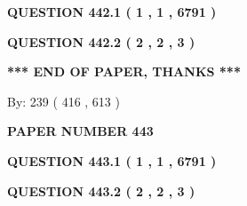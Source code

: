 \documentclass[12pt]{article}
\begin{document}
   
   
   
 \vspace{0.2in}
 
 
 
 
   
   
  
\vspace{0.2in}
  
{\textbf{\Large{QUESTION
442.1 
 ( 1 , 1 , 6791 )
}}}
  
  
  
\vspace{0.2in}
  
{\textbf{\Large{QUESTION
442.2 
 ( 2 , 2 , 3 )
}}}
  
  
   
   
 \vspace{0.2in}
 
   
   
   
   
\vspace{1.0in} 
{\textbf{\large{ *** END OF PAPER, THANKS *** }}} 
   
   
\hspace{1.0in} By: 
 239 ( 416 ,  613 )
   
   
   
   
\newpage 
\setcounter{page}{ 
   443001 } 
   
   
   
   
 {\textbf{ \Large{ PAPER NUMBER  443  }}}
   
   
\vspace{0.2in}
   
   
   
   
   
   
 \vspace{0.2in}
 
 
 
 
   
   
  
\vspace{0.2in}
  
{\textbf{\Large{QUESTION
443.1 
 ( 1 , 1 , 6791 )
}}}
  
  
  
\vspace{0.2in}
  
{\textbf{\Large{QUESTION
443.2 
 ( 2 , 2 , 3 )
}}}
  
  
   
   
 \vspace{0.2in}
 
\end{document}

